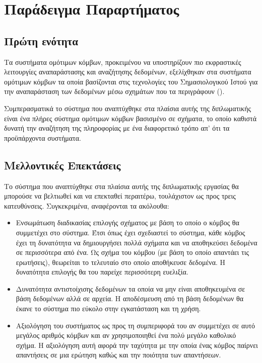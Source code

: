 \chapter{Παράδειγμα Παραρτήματος}

\section{Πρώτη ενότητα}
Τα συστήματα ομότιμων κόμβων, προκειμένου να υποστηρίζουν πιο
εκφραστικές λειτουργίες αναπαράστασης και αναζήτησης δεδομένων,
εξελίχθηκαν στα συστήματα ομότιμων κόμβων τα οποία βασίζονται στις
τεχνολογίες του Σημασιολογικού Ιστού για την αναπαράσταση των
δεδομένων μέσω σχημάτων που τα περιγράφουν ().

Συμπερασματικά το σύστημα που αναπτύχθηκε στα πλαίσια αυτής της
διπλωματικής είναι ένα πλήρες σύστημα ομότιμων κόμβων βασισμένο σε
σχήματα, το οποίο καθιστά δυνατή την αναζήτηση της πληροφορίας με
ένα διαφορετικό τρόπο απ' ότι τα προϋπάρχοντα  συστήματα.

\section{Μελλοντικές Επεκτάσεις}
Το σύστημα που αναπτύχθηκε στα πλαίσια αυτής της διπλωματικής
εργασίας θα μπορούσε να βελτιωθεί και να επεκταθεί περαιτέρω,
τουλάχιστον ως προς τρεις κατευθύνσεις. Συγκεκριμένα, αναφέρονται
τα ακόλουθα:

\begin{itemize}
\item Ενσωμάτωση διαδικασίας επιλογής σχήματος με βάση το οποίο ο
κόμβος θα συμμετέχει στο σύστημα. Έτσι όπως έχει σχεδιαστεί το
σύστημα, κάθε κόμβος έχει τη δυνατότητα να δημιουργήσει πολλά
σχήματα και να αποθηκεύσει δεδομένα σε περισσότερα από ένα. Ως
σχήμα του κόμβου (με βάση το οποίο απαντάει τις ερωτήσεις),
θεωρείται το τελευταίο στο οποίο αποθήκευσε δεδομένα. Η δυνατότητα
επιλογής θα του παρείχε περισσότερη ευελιξία.
\item Δυνατότητα αντιστοίχισης δεδομένων τα οποία να μην είναι
αποθηκευμένα σε βάση δεδομένων αλλά σε αρχεία. Η αποδέσμευση από
τη βάση δεδομένων θα έκανε το σύστημα πιο εύκολο στην εγκατάσταση
και τη χρήση.
\item Αξιολόγηση του συστήματος ως προς τη συμπεριφορά του αν
συμμετέχει σε αυτό μεγάλος αριθμός κόμβων  και αν χρησιμοποιηθεί ένα πολύ μεγάλο καθολικό σχήμα. H
αξιολόγηση αυτή αφορά την ταχύτητα με την οποία ένας κόμβος
παίρνει απαντήσεις σε μια ερώτηση καθώς και την ποιότητα των
απαντήσεων.
\end{itemize}

